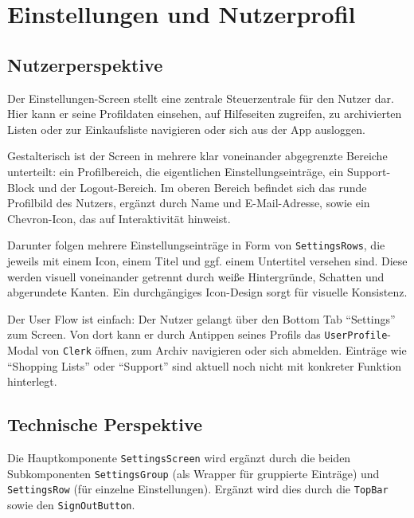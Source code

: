\chapter{Einstellungen und Nutzerprofil}
\renewcommand{\authorinitials}{FK}

\section{Nutzerperspektive}

Der Einstellungen-Screen stellt eine zentrale Steuerzentrale für den Nutzer dar. Hier kann er seine Profildaten einsehen, auf Hilfeseiten zugreifen, zu archivierten Listen oder zur Einkaufsliste navigieren oder sich aus der App ausloggen.

Gestalterisch ist der Screen in mehrere klar voneinander abgegrenzte Bereiche unterteilt: ein Profilbereich, die eigentlichen Einstellungseinträge, ein Support-Block und der Logout-Bereich. Im oberen Bereich befindet sich das runde Profilbild des Nutzers, ergänzt durch Name und E-Mail-Adresse, sowie ein Chevron-Icon, das auf Interaktivität hinweist.

Darunter folgen mehrere Einstellungseinträge in Form von \texttt{SettingsRows}, die jeweils mit einem Icon, einem Titel und ggf. einem Untertitel versehen sind. Diese werden visuell voneinander getrennt durch weiße Hintergründe, Schatten und abgerundete Kanten. Ein durchgängiges Icon-Design sorgt für visuelle Konsistenz.

Der User Flow ist einfach: Der Nutzer gelangt über den Bottom Tab \enquote{Settings} zum Screen. Von dort kann er durch Antippen seines Profils das \texttt{UserProfile}-Modal von \texttt{Clerk} öffnen, zum Archiv navigieren oder sich abmelden. Einträge wie \enquote{Shopping Lists} oder \enquote{Support} sind aktuell noch nicht mit konkreter Funktion hinterlegt.

\section{Technische Perspektive}

Die Hauptkomponente \texttt{SettingsScreen} wird ergänzt durch die beiden Subkomponenten \texttt{SettingsGroup} (als Wrapper für gruppierte Einträge) und \texttt{SettingsRow} (für einzelne Einstellungen). Ergänzt wird dies durch die \texttt{TopBar} sowie den \texttt{SignOutButton}.

